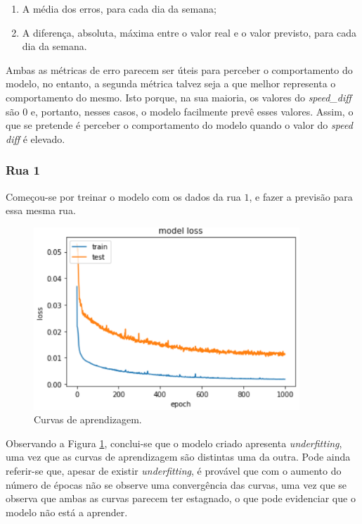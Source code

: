 \documentclass[a4paper, 12pt]{article}
\begin{document}
\begin{enumerate}
	\item A média dos erros, para cada dia da semana;
	\item A diferença, absoluta, máxima entre o valor real e o valor previsto, para cada dia da semana.
\end{enumerate}

Ambas as métricas de erro parecem ser úteis para perceber o comportamento do modelo, no entanto, a segunda métrica talvez seja a que melhor representa o comportamento do mesmo. Isto porque, na sua maioria, os valores do \textit{speed\_diff} são $0$ e, portanto, nesses casos, o modelo facilmente prevê esses valores. Assim, o que se pretende é perceber o comportamento do modelo quando o valor do \textit{speed diff} é elevado.

\subsubsection{Rua 1}

Começou-se por treinar o modelo com os dados da rua $1$, e fazer a previsão para essa mesma rua. 

\begin{figure}[H]
	\centering
	\includegraphics[width=10cm]{resultados/curvas_aprend_1.png}
	\caption{Curvas de aprendizagem.}
	\label{figure:curvas_aprend_1}
\end{figure}

Observando a Figura \ref{figure:curvas_aprend_1}, conclui-se que o modelo criado apresenta \textit{underfitting}, uma vez que as curvas de aprendizagem são distintas uma da outra. Pode ainda referir-se que, apesar de existir \textit{underfitting}, é provável que com o aumento do número de épocas não se observe uma convergência das curvas, uma vez que se observa que ambas as curvas parecem ter estagnado, o que pode evidenciar que o modelo não está a aprender.
\end{document}

